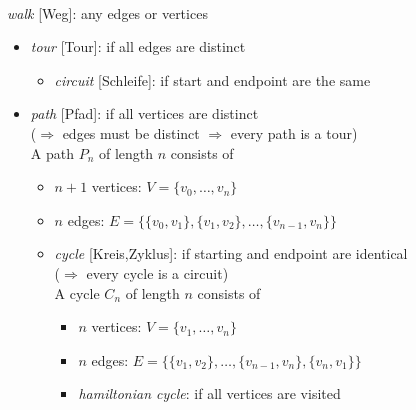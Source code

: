\documentclass[a4paper]{extarticle}
\newcommand{\listarrow}{
\smash{\scalebox{1.5}[1.75]{\rotatebox[origin=c]{180}{$\Lsh$}}}
}
\begin{document}
\begin{multicols*}{2}
 \\
\emph{walk} [Weg]: any edges or vertices
\begin{itemize}[label=\listarrow]
  \item \emph{tour} [Tour]: if all edges are distinct
  \begin{itemize}[label=\listarrow]
    \item \emph{circuit} [Schleife]: if start and endpoint are the same
  \end{itemize}
  \item \emph{path} [Pfad]: if all vertices are distinct\\
  ($\Longrightarrow$ edges must be distinct $\Longrightarrow$ every path is a
  tour)\\
  A path $P_n$ of length $n$ consists of
  \vspace{-3pt}
  \begin{itemize}[label=$\cdot$,noitemsep,nolistsep,
    topsep=0pt,parsep=0pt,partopsep=0pt]
    \item $n+1$ vertices: $V=\{v_0,\ldots,v_n\}$
    \item $n$ edges: $E=\{\{v_0,v_1\},\{v_1,v_2\},\ldots,\{v_{n-1},v_n\}\}$
  \end{itemize}
  \vspace{-3pt}
  \begin{itemize}[label=\listarrow]
    \item \emph{cycle} [Kreis,Zyklus]: if starting and endpoint are identical\\
    ($\Longrightarrow$ every cycle is a circuit) \\
    A cycle $C_n$ of length $n$ consists of
    \vspace{-3pt}
    \begin{itemize}[label=$\cdot$,noitemsep,nolistsep,
      topsep=0pt,parsep=0pt,partopsep=0pt]
      \item $n$ vertices: $V=\{v_1,\ldots,v_n\}$
      \item $n$ edges: $E=\{\{v_1,v_2\},\ldots,\{v_{n-1},v_{n}\},\{v_n,v_1\}\}$
    \end{itemize}
    \vspace{-3pt}
    \begin{itemize}[label=\listarrow]
      \item \emph{hamiltonian cycle}: if all vertices are visited
    \end{itemize}
  \end{itemize}
\end{itemize}


\end{multicols*}
\end{document}
